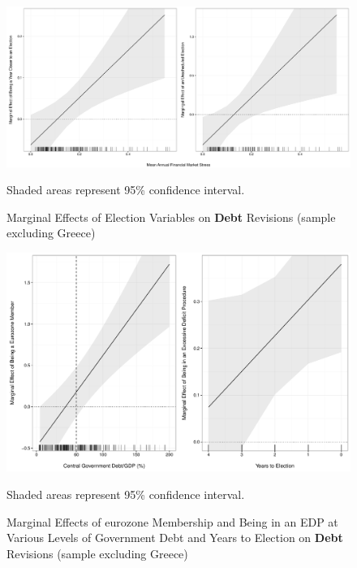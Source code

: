 \documentclass[]{article}
\begin{document}
\begin{figure}[H]
    \caption{Marginal Effects of Election Variables on \textbf{Debt} Revisions (sample excluding Greece)}
    \label{me_no_greece}

    \begin{center}
        \includegraphics[scale=0.4]{figures/debt_me_nogreece.pdf}
    \end{center}

	{\scriptsize{Shaded areas represent 95\% confidence interval.}}

\end{figure}

\begin{figure}[H]
    \caption{Marginal Effects of eurozone Membership and Being in an EDP at Various Levels of Government Debt and Years to Election on \textbf{Debt} Revisions (sample excluding Greece)}
    \label{me_no_greece_edp_timing}

    \begin{center}
        \includegraphics[scale=0.5]{figures/edp_debt_elect_me_nogr.pdf}
    \end{center}

	{\scriptsize{Shaded areas represent 95\% confidence interval.}}

\end{figure}
\end{document}
